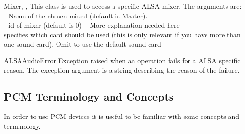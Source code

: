 \begin{classdesc}{Mixer}{, , }
This class is used to access a specific ALSA mixer.
The arguments are: \\
 - Name of the chosen mixed (default is Master). \\
 - id of mixer (default is 0) -- More explanation needed here\\
 specifies which card should be used (this is only relevant 
if you have more than one sound card). Omit to use the default sound card
\end{classdesc}


\begin{excdesc}{ALSAAudioError}
  Exception raised when an operation fails for a ALSA specific reason.
  The exception argument is a string describing the reason of the
  failure.
\end{excdesc}

\subsection{PCM Terminology and Concepts}

In order to use PCM devices it is useful to be familiar with some concepts and
terminology.

